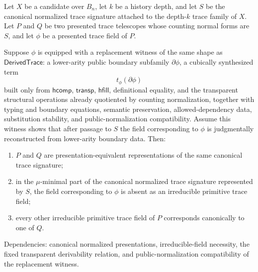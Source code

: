 \documentclass{lmcs}
\begin{document}
\begin{thm}
Let \(X\) be a candidate over \(B_n\), let \(k\) be a history depth, and let \(S\) be the
canonical normalized trace signature attached to the depth-\(k\) trace family of \(X\).  Let
\(P\) and \(Q\) be two presented trace telescopes whose counting normal forms are \(S\), and
let \(\phi\) be a presented trace field of \(P\).

Suppose \(\phi\) is equipped with a replacement witness of the same shape as
\(\mathsf{DerivedTrace}\): a lower-arity public boundary subfamily \(\partial\phi\), a
cubically synthesized term
\[
  t_\phi(\partial\phi)
\]
built only from \(\mathsf{hcomp}\), \(\mathsf{transp}\), \(\mathsf{hfill}\), definitional
equality, and the transparent structural operations already quotiented by counting
normalization, together with typing and boundary equations, semantic preservation,
allowed-dependency data, substitution stability, and public-normalization compatibility.
Assume this witness shows that after passage to \(S\) the field corresponding to \(\phi\) is
judgmentally reconstructed from lower-arity boundary data.  Then:
\begin{enumerate}
\item \(P\) and \(Q\) are presentation-equivalent representations of the same canonical trace
signature;
\item in the \(\mu\)-minimal part of the canonical normalized trace signature represented by
\(S\), the field corresponding to \(\phi\) is absent as an irreducible primitive trace field;
\item every other irreducible primitive trace field of \(P\) corresponds canonically to one of
\(Q\).
\end{enumerate}

Dependencies: canonical normalized presentations, irreducible-field necessity, the fixed
transparent derivability relation, and public-normalization compatibility of the replacement
witness.
\end{thm}
\end{document}
